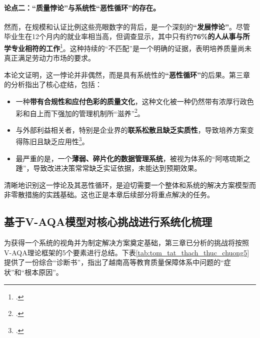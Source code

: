 \paragraph{论点二：“质量悖论”与系统性“恶性循环”的存在。}
然而，在规模和认证比例这些亮眼数字的背后，是一个深刻的\textbf{“发展悖论”}。尽管毕业生在12个月内的就业率相当高，但调查显示，其中只有约\textbf{76\%的人从事与所学专业相符的工作}\footcite{neu_tylevieclam}。这种持续的“不匹配”是一个明确的证据，表明培养质量尚未真正满足劳动力市场的要求。

本论文证明，这一悖论并非偶然，而是具有系统性的\textbf{“恶性循环”}的后果。第三章的分析指出了核心症结，包括：
\begin{itemize}
    \item 一种\textbf{带有合规性和应付色彩的质量文化}，这种文化被一种仍然带有浓厚行政色彩和自上而下强加的管理机制所“滋养”\footcite{vjol_reactiveculture}。
    \item 与外部利益相关者，特别是企业界的\textbf{联系松散且缺乏实质性}，导致培养方案变得陈旧且缺乏应用性\footcite{worldbank_improvingperformance}。
    \item 最严重的是，一个\textbf{薄弱、碎片化的数据管理系统}，被视为体系的“阿喀琉斯之踵”，导致改进决策常常缺乏实证依据，未能达到预期效果。
\end{itemize}

清晰地识别这一悖论及其恶性循环，是迫切需要一个整体和系统的解决方案模型而非零散措施的实践基础。这也正是本章后续部分将重点解决的任务。

\subsection{基于V-AQA模型对核心挑战进行系统化梳理}
\label{subsec:he_thong_hoa_thach_thuc}

为获得一个系统的视角并为制定解决方案奠定基础，第三章已分析的挑战将按照V-AQA理论框架的5个要素进行总结。下表\ref{tab:tom_tat_thach_thuc_chuong5}提供了一份综合“诊断书”，指出了越南高等教育质量保障体系中问题的“症状”和“根本原因”。

